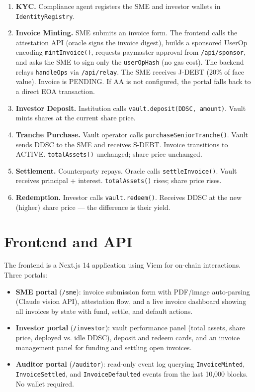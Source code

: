 \documentclass[11pt,a4paper]{article}
\begin{document}
\begin{enumerate}[leftmargin=2em, topsep=2pt, itemsep=2pt, label=\textbf{\arabic*.}]
  \item \textbf{KYC.} Compliance agent registers the SME and investor wallets in
    \texttt{IdentityRegistry}.
  \item \textbf{Invoice Minting.} SME submits an invoice form. The frontend calls the
    attestation API (oracle signs the invoice digest), builds a sponsored UserOp
    encoding \texttt{mintInvoice()}, requests paymaster approval from \texttt{/api/sponsor},
    and asks the SME to sign only the \texttt{userOpHash} (no gas cost). The backend
    relays \texttt{handleOps} via \texttt{/api/relay}. The SME receives J-DEBT (20\% of
    face value). Invoice is PENDING. If AA is not configured, the portal falls back to
    a direct EOA transaction.
  \item \textbf{Investor Deposit.} Institution calls \texttt{vault.deposit(DDSC, amount)}.
    Vault mints shares at the current share price.
  \item \textbf{Tranche Purchase.} Vault operator calls \texttt{purchaseSeniorTranche()}.
    Vault sends DDSC to the SME and receives S-DEBT. Invoice transitions to ACTIVE.
    \texttt{totalAssets()} unchanged; share price unchanged.
  \item \textbf{Settlement.} Counterparty repays. Oracle calls \texttt{settleInvoice()}.
    Vault receives principal + interest. \texttt{totalAssets()} rises; share price rises.
  \item \textbf{Redemption.} Investor calls \texttt{vault.redeem()}. Receives DDSC at the
    new (higher) share price — the difference is their yield.
\end{enumerate}

\section{Frontend and API}

The frontend is a Next.js 14 application using Viem for on-chain interactions. Three portals:

\begin{itemize}[leftmargin=2em, topsep=2pt, itemsep=1pt]
  \item \textbf{SME portal} (\texttt{/sme}): invoice submission form with PDF/image auto-parsing
    (Claude vision API), attestation flow, and a live invoice dashboard showing all invoices by
    state with fund, settle, and default actions.
  \item \textbf{Investor portal} (\texttt{/investor}): vault performance panel (total assets,
    share price, deployed vs. idle DDSC), deposit and redeem cards, and an invoice management
    panel for funding and settling open invoices.
  \item \textbf{Auditor portal} (\texttt{/auditor}): read-only event log querying
    \texttt{InvoiceMinted}, \texttt{InvoiceSettled}, and \texttt{InvoiceDefaulted} events
    from the last 10,000 blocks. No wallet required.
\end{itemize}
\end{document}
